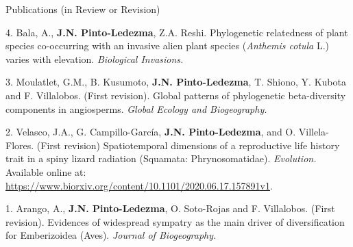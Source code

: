 \documentclass{resume} %
\begin{document}
\begin{rSection}{Publications (in Review or Revision)} 

\normalfont 

{4.} {Bala, A.,} {\bf{J.N. Pinto-Ledezma\dag}}, {Z.A. Reshi\dag. Phylogenetic relatedness of plant species co-occurring with an invasive alien plant species ({\em Anthemis cotula} L.) varies with elevation.} {\em Biological Invasions.}

{3.} {Moulatlet, G.M., B. Kusumoto,} {\bf{J.N. Pinto-Ledezma}}, { T. Shiono, Y. Kubota and F. Villalobos. (First revision). Global patterns of phylogenetic beta-diversity components in angiosperms.} {\em Global Ecology and Biogeography.}

{2.} {Velasco, J.A., G. Campillo-García,} {\bf{J.N. Pinto-Ledezma}}, {and O. Villela-Flores. (First revision) Spatiotemporal dimensions of a reproductive life history trait in a spiny lizard radiation (Squamata: Phrynosomatidae).} {\em Evolution.} {Available online at:} \url {https://www.biorxiv.org/content/10.1101/2020.06.17.157891v1}.

{1.} {Arango, A.,} {\bf{J.N. Pinto-Ledezma}}, { O. Soto-Rojas and F. Villalobos. (First revision). Evidences of widespread sympatry as the main driver of diversification for Emberizoidea (Aves).} {\em Journal of Biogeography.}



\end{rSection}




\end{document}
